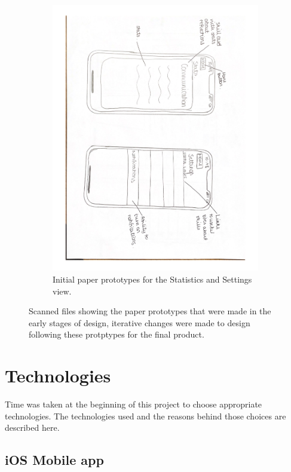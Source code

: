 \documentclass{l4proj}
\begin{document}
\begin{figure}
\begin{subfigure}[b]{1\textwidth}
        \includegraphics[scale=0.45, angle = 90]{images/PaperWireframes2.pdf}
        \caption{Initial paper prototypes for the Statistics and Settings view.}
        \label{fig:PaperWireframe2}
    \end{subfigure}     
    \caption{Scanned files showing the paper prototypes that were made in the early stages of design, iterative changes were made to design following these protptypes for the final product.}
    \label{fig:PaperPrototypes}
\end{figure}

\section{Technologies}
Time was taken at the beginning of this project to choose appropriate technologies. The technologies used and the reasons behind those choices are described here.

\subsection{iOS Mobile app}
\end{document}
